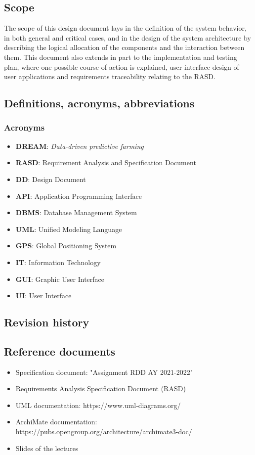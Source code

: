 \documentclass[table, 12pt]{article}
\begin{document}
\subsection{Scope}
The scope of this design document lays in the definition of the system behavior, in both general and critical cases, and in the design of the system architecture by describing the
logical allocation of the components and the interaction between them.
This document also extends in part to the implementation and testing plan, where one possible course of action is explained, user interface design of user applications and requirements traceability relating to the RASD.
\subsection{Definitions, acronyms, abbreviations}
\subsubsection*{Acronyms}
\begin{itemize}
    \item \textbf{DREAM}: \emph{Data-driven predictive farming}
    \item \textbf{RASD}: Requirement Analysis and Specification Document
    \item \textbf{DD}: Design Document
    \item \textbf{API}: Application Programming Interface
    \item \textbf{DBMS}: Database Management System
    \item \textbf{UML}: Unified Modeling Language
    \item \textbf{GPS}: Global Positioning System
    \item \textbf{IT}: Information Technology
    \item \textbf{GUI}: Graphic User Interface
    \item \textbf{UI}: User Interface
\end{itemize}
\subsection{Revision history}

\subsection{Reference documents}
\begin{itemize}
    \item Specification document: "Assignment RDD AY 2021-2022"
    \item Requirements Analysis Specification Document (RASD)
    \item UML documentation: https://www.uml-diagrams.org/
    \item ArchiMate documentation: https://pubs.opengroup.org/architecture/archimate3-doc/
    \item Slides of the lectures
\end{itemize}
\end{document}
